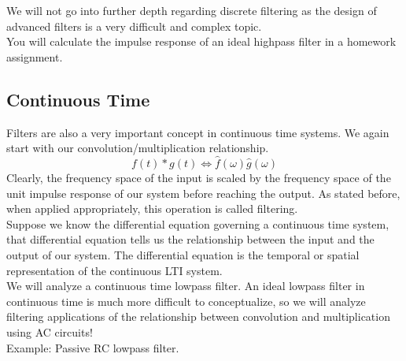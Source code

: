 \documentclass[a4paper]{article}
\numberwithin{equation}{section}
\begin{document}
We will not go into further depth regarding discrete filtering as the design of advanced filters is a very difficult and complex topic. \\

You will calculate the impulse response of an ideal highpass filter in a homework assignment.

\subsection{Continuous Time}
Filters are also a very important concept in continuous time systems. We again start with our convolution/multiplication relationship.
\begin{equation}
f(t)*g(t) \Longleftrightarrow \hat{f}(\omega)\hat{g}(\omega)
\end{equation}
Clearly, the frequency space of the input is scaled by the frequency space of the unit impulse response of our system before reaching the output. As stated before, when applied appropriately, this operation is called filtering. \\

Suppose we know the differential equation governing a continuous time system, that differential equation tells us the relationship between the input and the output of our system. The differential equation is the temporal or spatial representation of the continuous LTI system.\\

We will analyze a continuous time lowpass filter. An ideal lowpass filter in continuous time is much more difficult to conceptualize, so we will analyze filtering applications of the relationship between convolution and multiplication using AC circuits!\\

Example: Passive RC lowpass filter.
\end{document}
